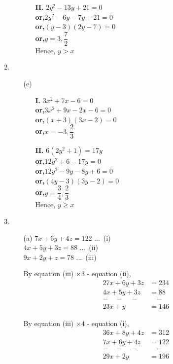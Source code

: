 \begin{multicols}{2}
\begin{enumerate}
\begin{itemize}
\begin{itemize}
\item[{\bf II.}] $2y^2 - 13y + 21 = 0$\\
  {\bf or,}\quad $2y^2 - 6y - 7y + 21 = 0$\\
  {\bf or,}\quad $(y - 3)(2y - 7) = 0$\\
  {\bf or,}\quad $y = 3, \dfrac{7}{2}$\\
  Hence, $y > x$
\end{itemize}
\end{itemize}
\item
\begin{itemize}
\item[(e)]
\begin{itemize}
\item[{\bf I.}] $3x^2 + 7x - 6 = 0$\\
  {\bf or,}\quad $3x^2 + 9x - 2x - 6 = 0$\\
  {\bf or,}\quad $(x + 3)(3x - 2) = 0$\\
  {\bf or,}\quad $x = -3, \dfrac{2}{3}$
\item[{\bf II.}] $6(2y^2 + 1) = 17y$\\
  {\bf or,}\quad $12y^2 + 6 - 17y = 0$\\
  {\bf or,}\quad $12y^2 - 9y - 8y + 6 = 0$\\
  {\bf or,}\quad $(4y - 3)(3y - 2) = 0$\\
  {\bf or,}\quad $y = \dfrac{3}{4}, \dfrac{2}{3}$\\
  Hence, $y \geq x$
\end{itemize}
\end{itemize}
\item
  \begin{itemize}
\item[(a)] $7x + 6y + 4z = 122$ \quad  ...\ (i)\\
      $4x + 5y + 3z = 88$ \quad  ...\ (ii)\\
      $9x + 2y + z  = 78$ \quad  ...\ (iii)
  
  By equation (iii) $\times 3$ - equation (ii),
\begin{equation*}
  \begin{array}{cc}
    27x + 6y + 3z & = 234\\
    4x + 5y + 3z & = 88\\
    - \quad - \quad - & \quad -\\
    \hline
    23x + y & = 146\tag*{...(iv)}
  \end{array}
\end{equation*}

  By equation (iii) $\times 4$ - equation (i),
\begin{equation*}
  \begin{array}{cc}
    36x + 8y + 4z & = 312\\
    7x + 6y + 4z & = 122\\
    - \quad - \quad - & \quad -\\
    \hline
    29x + 2y & = 196\tag*{...(v)}
  \end{array}
\end{equation*}


\end{itemize}
\end{enumerate}
\end{multicols}
